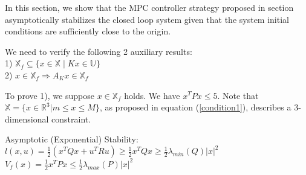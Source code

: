 In this section, we show that the MPC controller strategy proposed in section \cite{textbook} %
asymptotically stabilizes the closed loop system given that the system initial conditions are sufficiently close to the origin. 

We need to verify the following 2 auxiliary results:\\
1) $\mathbb{X} _f \subseteq \{x \in \mathbb{X} \mid Kx \in \mathbb{U} \}$\\
2) $x \in \mathbb{X}_f \Rightarrow A_K x \in \mathbb{X} _f$

To prove 1), we suppose $x \in \mathbb{X}_f$ holds. We have $x^T Px \leq 5$. Note that $\mathbb{X}=\{x \in \mathbb{R} ^3 | m \leq x \leq M \}$, as proposed in equation (\ref{condition1}), describes a 3-dimensional constraint.

Asymptotic (Exponential) Stability:
$l(x,u) = \frac{1}{2}(x^T Qx + u^T Ru) \geq \frac{1}{2}x^T Qx \geq \frac{1}{2} \lambda_{min}(Q)|x|^2$
$V_f (x) = \frac{1}{2}x^T Px \leq \frac{1}{2}\lambda_{max}(P)|x|^2$